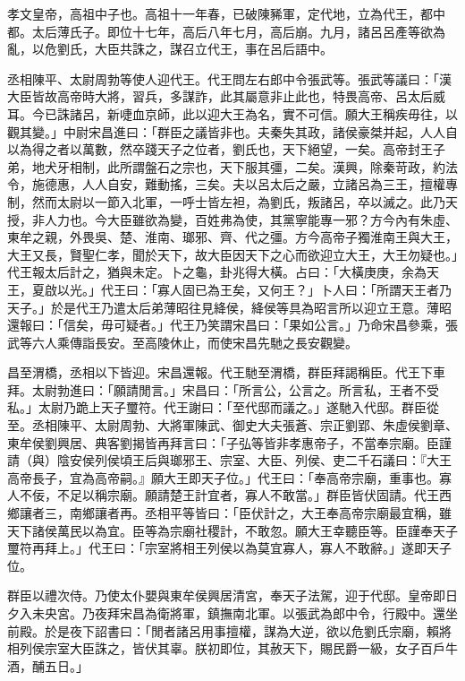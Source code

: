 
\begin{pinyinscope}
孝文皇帝，高祖中子也。高祖十一年春，已破陳豨軍，定代地，立為代王，都中都。太后薄氏子。即位十七年，高后八年七月，高后崩。九月，諸呂呂產等欲為亂，以危劉氏，大臣共誅之，謀召立代王，事在呂后語中。

丞相陳平、太尉周勃等使人迎代王。代王問左右郎中令張武等。張武等議曰：「漢大臣皆故高帝時大將，習兵，多謀詐，此其屬意非止此也，特畏高帝、呂太后威耳。今已誅諸呂，新啑血京師，此以迎大王為名，實不可信。願大王稱疾毋往，以觀其變。」中尉宋昌進曰：「群臣之議皆非也。夫秦失其政，諸侯豪桀并起，人人自以為得之者以萬數，然卒踐天子之位者，劉氏也，天下絕望，一矣。高帝封王子弟，地犬牙相制，此所謂盤石之宗也，天下服其彊，二矣。漢興，除秦苛政，約法令，施德惠，人人自安，難動搖，三矣。夫以呂太后之嚴，立諸呂為三王，擅權專制，然而太尉以一節入北軍，一呼士皆左袒，為劉氏，叛諸呂，卒以滅之。此乃天授，非人力也。今大臣雖欲為變，百姓弗為使，其黨寧能專一邪？方今內有朱虛、東牟之親，外畏吳、楚、淮南、瑯邪、齊、代之彊。方今高帝子獨淮南王與大王，大王又長，賢聖仁孝，聞於天下，故大臣因天下之心而欲迎立大王，大王勿疑也。」代王報太后計之，猶與未定。卜之龜，卦兆得大橫。占曰：「大橫庚庚，余為天王，夏啟以光。」代王曰：「寡人固已為王矣，又何王？」卜人曰：「所謂天王者乃天子。」於是代王乃遣太后弟薄昭往見絳侯，絳侯等具為昭言所以迎立王意。薄昭還報曰：「信矣，毋可疑者。」代王乃笑謂宋昌曰：「果如公言。」乃命宋昌參乘，張武等六人乘傳詣長安。至高陵休止，而使宋昌先馳之長安觀變。

昌至渭橋，丞相以下皆迎。宋昌還報。代王馳至渭橋，群臣拜謁稱臣。代王下車拜。太尉勃進曰：「願請閒言。」宋昌曰：「所言公，公言之。所言私，王者不受私。」太尉乃跪上天子璽符。代王謝曰：「至代邸而議之。」遂馳入代邸。群臣從至。丞相陳平、太尉周勃、大將軍陳武、御史大夫張蒼、宗正劉郢、朱虛侯劉章、東牟侯劉興居、典客劉揭皆再拜言曰：「子弘等皆非孝惠帝子，不當奉宗廟。臣謹請（與）陰安侯列侯頃王后與瑯邪王、宗室、大臣、列侯、吏二千石議曰：『大王高帝長子，宜為高帝嗣。』願大王即天子位。」代王曰：「奉高帝宗廟，重事也。寡人不佞，不足以稱宗廟。願請楚王計宜者，寡人不敢當。」群臣皆伏固請。代王西鄉讓者三，南鄉讓者再。丞相平等皆曰：「臣伏計之，大王奉高帝宗廟最宜稱，雖天下諸侯萬民以為宜。臣等為宗廟社稷計，不敢忽。願大王幸聽臣等。臣謹奉天子璽符再拜上。」代王曰：「宗室將相王列侯以為莫宜寡人，寡人不敢辭。」遂即天子位。

群臣以禮次侍。乃使太仆嬰與東牟侯興居清宮，奉天子法駕，迎于代邸。皇帝即日夕入未央宮。乃夜拜宋昌為衛將軍，鎮撫南北軍。以張武為郎中令，行殿中。還坐前殿。於是夜下詔書曰：「閒者諸呂用事擅權，謀為大逆，欲以危劉氏宗廟，賴將相列侯宗室大臣誅之，皆伏其辜。朕初即位，其赦天下，賜民爵一級，女子百戶牛酒，酺五日。」


\end{pinyinscope}
